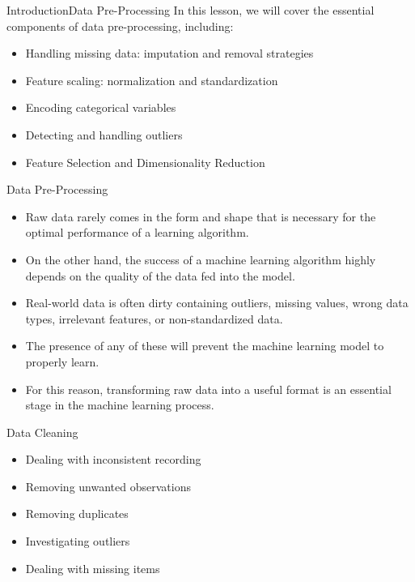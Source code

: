 \documentclass[11pt]{beamer}
\begin{document}
%
%
\begin{frame}{Introduction}{Data Pre-Processing}
In this lesson, we will cover the essential components of data pre-processing, including:

\begin{itemize}
\item Handling missing data: imputation and removal strategies
\item Feature scaling: normalization and standardization
\item Encoding categorical variables
\item Detecting and handling outliers
\item Feature Selection and Dimensionality Reduction
\end{itemize}
\end{frame}
%
%
\begin{frame}{Data Pre-Processing}
	\begin{itemize}
		\item Raw data rarely comes in the form and shape that is necessary for the optimal performance of a learning algorithm. 
		\item On the other hand, the success of a machine learning algorithm highly depends on the quality of the data fed into the model. 
		\item Real-world data is often dirty containing outliers, missing values, wrong data types, irrelevant features, or non-standardized data. 
		\item The presence of any of these will prevent the machine learning model to properly learn. 
		\item For this reason, transforming raw data into a useful format is an essential stage in the machine learning process. 
	\end{itemize}
\end{frame}
%
%
\begin{frame}{Data Cleaning}
	\begin{itemize}
		\item Dealing with inconsistent recording
		\item Removing unwanted observations
		\item Removing duplicates
		\item Investigating outliers
		\item Dealing with missing items
	\end{itemize}
\end{frame}
%
%
\end{document}
